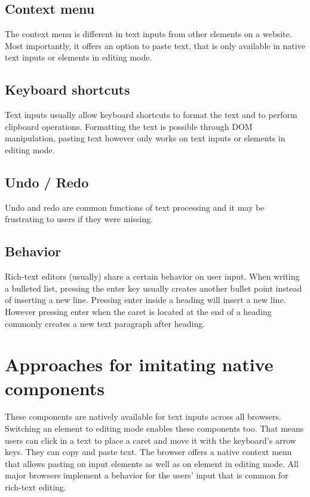 \subsection{Context menu} The context menu is different in text inputs from other elements on a website. Most importantly, it offers an option to paste text, that is only available in native text inputs or elements in editing mode.

\subsection{Keyboard shortcuts} Text inputs usually allow keyboard shortcuts to format the text and to perform clipboard operations. Formatting the text is possible through DOM manipulation, pasting text however only works on text inputs or elements in editing mode. %

\subsection{Undo / Redo} Undo and redo are common functions of text processing and it may be frustrating to users if they were missing.

\subsection{Behavior} Rich-text editors (usually) share a certain behavior on user input. When writing a bulleted list, pressing the enter key usually creates another bullet point instead of inserting a new line. Pressing enter inside a heading will insert a new line. However pressing enter when the caret is located at the end of a heading commonly creates a new text paragraph after heading. %

\section{Approaches for imitating native components} 
\label{sec:approaches_for_imitating_native_components}

These components are natively available for text inputs across all browsers. Switching an element to editing mode enables these components too. That means users can click in a text to place a caret and move it with the keyboard's arrow keys. They can copy and paste text. The browser offers a native context menu that allows pasting on input elements as well as on element in editing mode. All major browsers implement a behavior for the users' input that is common for rich-text editing.

